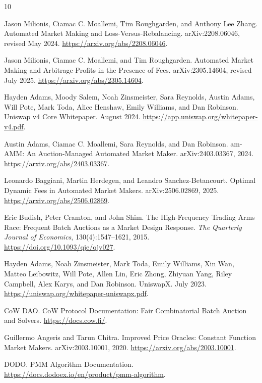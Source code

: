 \documentclass[11pt]{article}
\begin{document}
\begin{thebibliography}{10}

Jason Milionis, Ciamac C. Moallemi, Tim Roughgarden, and Anthony Lee Zhang.
\newblock Automated Market Making and Loss-Versus-Rebalancing.
\newblock arXiv:2208.06046, revised May 2024.
\newblock \url{https://arxiv.org/abs/2208.06046}.

Jason Milionis, Ciamac C. Moallemi, and Tim Roughgarden.
\newblock Automated Market Making and Arbitrage Profits in the Presence of Fees.
\newblock arXiv:2305.14604, revised July 2025.
\newblock \url{https://arxiv.org/abs/2305.14604}.

Hayden Adams, Moody Salem, Noah Zinsmeister, Sara Reynolds, Austin Adams, Will Pote, Mark Toda, Alice Henshaw, Emily Williams, and Dan Robinson.
\newblock Uniswap v4 Core Whitepaper.
\newblock August 2024.
\newblock \url{https://app.uniswap.org/whitepaper-v4.pdf}.

Austin Adams, Ciamac C. Moallemi, Sara Reynolds, and Dan Robinson.
\newblock am-AMM: An Auction-Managed Automated Market Maker.
\newblock arXiv:2403.03367, 2024.
\newblock \url{https://arxiv.org/abs/2403.03367}.

Leonardo Baggiani, Martin Herdegen, and Leandro Sanchez-Betancourt.
\newblock Optimal Dynamic Fees in Automated Market Makers.
\newblock arXiv:2506.02869, 2025.
\newblock \url{https://arxiv.org/abs/2506.02869}.

Eric Budish, Peter Cramton, and John Shim.
\newblock The High-Frequency Trading Arms Race: Frequent Batch Auctions as a Market Design Response.
\newblock \emph{The Quarterly Journal of Economics}, 130(4):1547--1621, 2015.
\newblock \url{https://doi.org/10.1093/qje/qjv027}.

Hayden Adams, Noah Zinsmeister, Mark Toda, Emily Williams, Xin Wan, Matteo Leibowitz, Will Pote, Allen Lin, Eric Zhong, Zhiyuan Yang, Riley Campbell, Alex Karys, and Dan Robinson.
\newblock UniswapX.
\newblock July 2023.
\newblock \url{https://uniswap.org/whitepaper-uniswapx.pdf}.

CoW DAO.
\newblock CoW Protocol Documentation: Fair Combinatorial Batch Auction and Solvers.
\newblock \url{https://docs.cow.fi/}.

Guillermo Angeris and Tarun Chitra.
\newblock Improved Price Oracles: Constant Function Market Makers.
\newblock arXiv:2003.10001, 2020.
\newblock \url{https://arxiv.org/abs/2003.10001}.

DODO.
\newblock PMM Algorithm Documentation.
\newblock \url{https://docs.dodoex.io/en/product/pmm-algorithm}.

\end{thebibliography}
\end{document}
